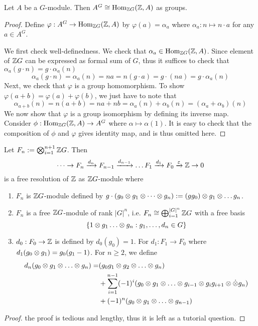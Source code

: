 \begin{lem}
    Let $A$ be a $G$-module. Then $A^G \cong \operatorname{Hom}_{{\mathbb Z} G}({\mathbb Z},A)$ as groups.
\end{lem}
\begin{proof}
    Define $\varphi: A^G \to \operatorname{Hom}_{{\mathbb Z} G}({\mathbb Z}, A)$ by $\varphi(a)= \alpha_a$ where $\alpha_a: n \mapsto n\cdot a$ for any $a\in A^G$.

    We first check well-definedness. We check that $\alpha_a \in \operatorname{Hom}_{{\mathbb Z} G}({\mathbb Z},A)$. Since element of ${\mathbb Z} G$ can be expressed as formal sum of $G$, thus it suffices to check that $\alpha_a(g\cdot n) = g\cdot \alpha_a(n)$ 
    \[\alpha_a(g\cdot n) = \alpha_a(n) = na = n(g \cdot a) = g\cdot (na) = g\cdot \alpha_a(n)\]
    Next, we check that $\varphi$ is a group homomorphism. To show $\varphi(a+b)= \varphi(a) + \varphi(b)$, we just have to note that 
    \[\alpha_{a+b}(n) = n(a+b) = na + nb = \alpha_a(n) + \alpha_b(n) = (\alpha_a + \alpha_b)(n)\]
    We now show that $\varphi$ is a group isomorphism by defining its inverse map. Consider $\phi:\operatorname{Hom}_{{\mathbb Z} G}({\mathbb Z}, A) \to A^G$ where $\alpha\mapsto \alpha(1)$. It is easy to check that the composition of $\phi$ and $\varphi$ gives identity map, and is thus omitted here.
\end{proof}

\begin{pro}
    Let $F_n := \bigotimes_{i=1}^{n+1} {\mathbb Z} G$. Then
    \[\dots \to F_n \xrightarrow{d_n} F_{n-1} \xrightarrow{d_{n-1}} \dots F_1 \xrightarrow{d_1} F_0 \xrightarrow{\varepsilon} {\mathbb Z} \to 0\]
    is a free resolution of ${\mathbb Z}$ as ${\mathbb Z} G$-module where
    \begin{enumerate}
        \item $F_n$ is ${\mathbb Z} G$-module defined by $g\cdot (g_0 \otimes g_1 \otimes \dots \otimes g_n) := (gg_0) \otimes g_1 \otimes \dots g_n$.
        \item $F_n$ is a free ${\mathbb Z} G$-module of rank $|G|^n$, i.e. $F_n \cong \bigoplus_{i=1}^{|G|^n} {\mathbb Z} G$ with a free basis
        \[\sbr{1\ten g_1 \dots \ten g_n:g_1, \dots, d_n\in G}\]
        \item $d_0:F_0 \to {\mathbb Z}$ is defined by $d_0(g_0)=1$. For $d_1:F_1\to F_0$ where $d_1(g_0\otimes g_1)= g_0(g_1-1)$. For $n\geq 2$, we define
        \begin{align*}
            d_n(g_0 \ten g_1 \ten \dots \ten g_n)=
            &(g_0g_1\ten g_2 \ten \dots \ten g_n)\\ 
            &+ \sum_{i=1}^{n-1}(-1)^i(g_0\ten g_1 \ten \dots \ten g_{i-1}\ten g_{i}g_{i+1} \ten \dot \ten g_n)\\ 
            &+ (-1)^n(g_0\ten g_1 \ten \dots \ten g_{n-1})
        \end{align*}
    \end{enumerate}
\end{pro}
\begin{proof}
    the proof is tedious and lengthy, thus it is left as a tutorial question.
\end{proof}

